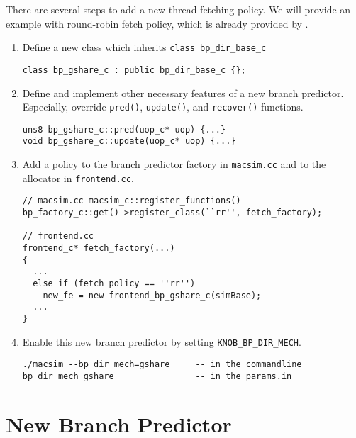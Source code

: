 
There are several steps to add a new thread fetching policy. We will
provide an example with round-robin fetch policy, which is already
provided by \SIM.

\begin{enumerate}
  \item Define a new class which inherits \Verb+class bp_dir_base_c+
\begin{Verbatim}
class bp_gshare_c : public bp_dir_base_c {};
\end{Verbatim}

  \item Define and implement other necessary features of a new branch
    predictor. Especially, override \Verb+pred()+, \Verb+update()+,
    and \Verb+recover()+ functions.
\begin{Verbatim}
uns8 bp_gshare_c::pred(uop_c* uop) {...}
void bp_gshare_c::update(uop_c* uop) {...}

\end{Verbatim}

  \item Add a policy to the branch predictor factory in
    \Verb+macsim.cc+ and to the allocator in \Verb+frontend.cc+.

\begin{Verbatim}
// macsim.cc macsim_c::register_functions()
bp_factory_c::get()->register_class(``rr'', fetch_factory);

// frontend.cc
frontend_c* fetch_factory(...) 
{
  ...
  else if (fetch_policy == ''rr'')
    new_fe = new frontend_bp_gshare_c(simBase);
  ...
}
\end{Verbatim}

  \item Enable this new branch predictor by setting \Verb+KNOB_BP_DIR_MECH+.
\begin{Verbatim}
./macsim --bp_dir_mech=gshare     -- in the commandline
bp_dir_mech gshare                -- in the params.in
\end{Verbatim}
\end{enumerate}



\section{New Branch Predictor}

